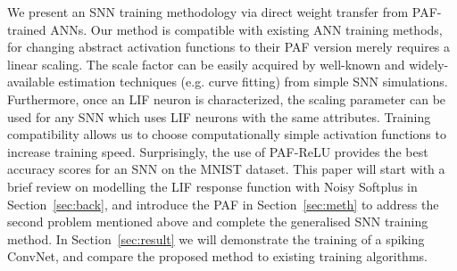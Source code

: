 \documentclass{article}
\begin{document}




We present an SNN training methodology via direct weight transfer from PAF-trained ANNs. Our method is compatible with existing ANN training methods, for changing abstract activation functions to their PAF version merely requires a linear scaling. The scale factor can be easily acquired by well-known and widely-available estimation techniques (e.g. curve fitting) from simple SNN simulations. Furthermore, once an LIF neuron is characterized, the scaling parameter can be used for any SNN which uses  LIF neurons with the same attributes. Training compatibility allows us to choose computationally simple activation functions to increase training speed. Surprisingly, the use of PAF-ReLU provides the best accuracy scores for an SNN on the MNIST dataset.
This paper will start with a brief review on modelling the LIF response function with Noisy Softplus in Section~\ref{sec:back}, and introduce the PAF in Section~\ref{sec:meth} to address the second problem mentioned above and complete the generalised SNN training method. In Section~\ref{sec:result} we will demonstrate the training of a spiking ConvNet, and compare the proposed method to existing training algorithms.
\end{document}
